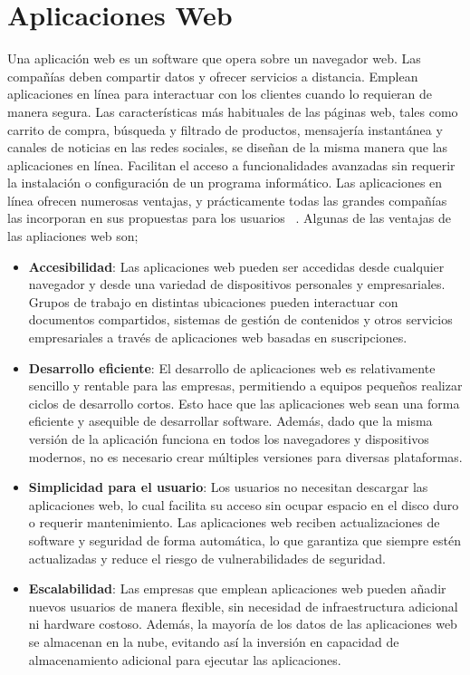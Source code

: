 \section{Aplicaciones Web}
Una aplicación web es un software que opera sobre un navegador web. Las compañías deben compartir datos y ofrecer servicios a distancia. Emplean aplicaciones en línea para interactuar con los clientes cuando lo requieran de manera segura. Las características más habituales de las páginas web, tales como carrito de compra, búsqueda y filtrado de productos, mensajería instantánea y canales de noticias en las redes sociales, se diseñan de la misma manera que las aplicaciones en línea. Facilitan el acceso a funcionalidades avanzadas sin requerir la instalación o configuración de un programa informático.
Las aplicaciones en línea ofrecen numerosas ventajas, y prácticamente todas las grandes compañías las incorporan en sus propuestas para los usuarios ~\cite{apliacionWebAmazon}. Algunas de las ventajas de las apliaciones web son;
\begin{itemize}
	\item \textbf{Accesibilidad}: Las aplicaciones web pueden ser accedidas desde cualquier navegador y desde una variedad de dispositivos personales y empresariales. Grupos de trabajo en distintas ubicaciones pueden interactuar con documentos compartidos, sistemas de gestión de contenidos y otros servicios empresariales a través de aplicaciones web basadas en suscripciones.
	
	\item \textbf{Desarrollo eficiente}: El desarrollo de aplicaciones web es relativamente sencillo y rentable para las empresas, permitiendo a equipos pequeños realizar ciclos de desarrollo cortos. Esto hace que las aplicaciones web sean una forma eficiente y asequible de desarrollar software. Además, dado que la misma versión de la aplicación funciona en todos los navegadores y dispositivos modernos, no es necesario crear múltiples versiones para diversas plataformas.
	
	\item \textbf{Simplicidad para el usuario}: Los usuarios no necesitan descargar las aplicaciones web, lo cual facilita su acceso sin ocupar espacio en el disco duro o requerir mantenimiento. Las aplicaciones web reciben actualizaciones de software y seguridad de forma automática, lo que garantiza que siempre estén actualizadas y reduce el riesgo de vulnerabilidades de seguridad.
	
	\item \textbf{Escalabilidad}: Las empresas que emplean aplicaciones web pueden añadir nuevos usuarios de manera flexible, sin necesidad de infraestructura adicional ni hardware costoso. Además, la mayoría de los datos de las aplicaciones web se almacenan en la nube, evitando así la inversión en capacidad de almacenamiento adicional para ejecutar las aplicaciones.
\end{itemize}

